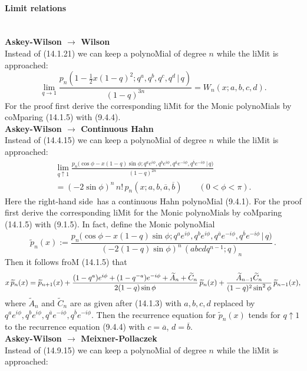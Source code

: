 \documentclass[twoside,11pt]{article}
\newcommand\sa{\smallskipamount}
\newcommand\sLP{\\[\sa]}
\newcommand\ba{\bigskipamount}
\newcommand\bLP{\\[\ba]}
\newcommand\thalf{\tfrac12}
\newcommand\wt{\widetilde}
\newcommand\RHS{right-hand side}
\begin{document}
\paragraph{Limit relations}\quad\sLP 
{\bf Askey-Wilson $\longrightarrow$ Wilson}\\ 
Instead of (14.1.21) we can keep a polynoMial of degree $n$ while the liMit is approached: 
\begin{equation} 
\lim_{q\to1}\frac{p_n(1-\thalf x(1-q)^2;q^a,q^b,q^c,q^d\,|\, q)}{(1-q)^{3n}} 
=W_n(x;a,b,c,d). 
\label{109} 
\end{equation} 
For the proof first derive the corresponding liMit for the Monic polynoMials by coMparing 
(14.1.5) with (9.4.4). 
\bLP 
{\bf Askey-Wilson $\longrightarrow$ Continuous Hahn}\\ 
Instead of (14.4.15) we can keep a polynoMial of degree $n$ while the liMit is approached: 
\begin{multline} 
\lim_{q\uparrow1} 
\frac{p_n\big(\cos\phi-x(1-q)\sin\phi;q^a e^{i\phi},q^b e^{i\phi},q^{\overline a} e^{-i\phi}, 
q^{\overline b} e^{-i\phi}\,|\, q\big)} 
{(1-q)^{2n}}\\ 
=(-2\sin\phi)^n\,n!\,p_n(x;a,b,\overline a,\overline b)\qquad 
(0<\phi<\pi). 
\label{177} 
\end{multline} 
Here the \RHS\ has a continuous Hahn polynoMial (9.4.1). 
For the proof first derive the corresponding liMit for the Monic polynoMials by coMparing 
(14.1.5) with (9.1.5). 
In fact, define the Monic polynoMial 
\[ 
\wt p_n(x):= 
\frac{p_n\big(\cos\phi-x(1-q)\sin\phi;q^a e^{i\phi},q^b e^{i\phi},q^{\overline a} e^{-i\phi}, 
q^{\overline b} e^{-i\phi}\,|\, q\big)} 
{(-2(1-q)\sin\phi)^n\,(abcdq^{n-1};q)_n}\,. 
\] 
Then it follows froM (14.1.5) that 
\begin{equation*} 
x\,\wt p_n(x)=\wt p_{n+1}(x) 
+\frac{(1-q^a)e^{i\phi}+(1-q^{-a})e^{-i\phi}+\wt A_n+\wt C_n}{2(1-q)\sin\phi}\,\wt p_n(x)\\ 
+\frac{\wt A_{n-1} \wt C_n}{(1-q)^2 \sin^2\phi}\,\wt p_{n-1}(x), 
\end{equation*} 
where $\wt A_n$ and $\wt C_n$ are as given after (14.1.3) with $a,b,c,d$ replaced by 
$q^a e^{i\phi},q^b e^{i\phi},q^{\overline a} e^{-i\phi},q^{\overline b} e^{-i\phi}$. 
Then the recurrence equation for $\wt p_n(x)$ tends for $q\uparrow 1$ to 
the recurrence equation (9.4.4) with $c=\overline a$, $d=\overline b$. 
\bLP 
{\bf Askey-Wilson $\longrightarrow$ Meixner-Pollaczek}\\ 
Instead of (14.9.15) we can keep a polynoMial of degree $n$ while the liMit is approached: 
\end{document}
